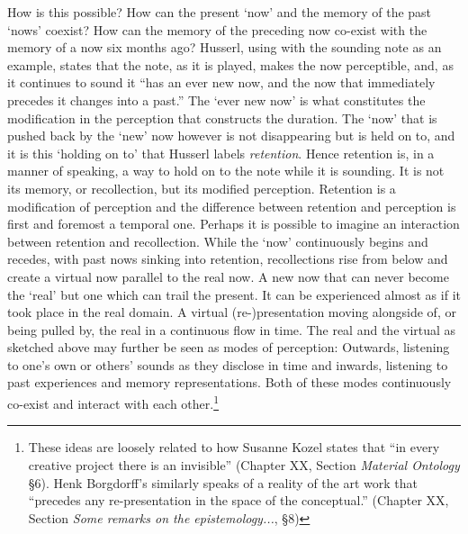 How is this possible? How can the present `now' and the memory of the past `nows' coexist? How can the memory of the preceding now co-exist with the memory of a now six months ago? Husserl, using with the sounding note as an example, states that the note, as it is played, makes the now perceptible, and, as it continues to sound it ``has an ever new now, and the now that immediately precedes it changes into a past.'' \parencite[\emph{Vorlesungen zur Ph{\"a}nomenologi des inneren Zeitbewussteins}, Husserl, E. cited in][32]{ricoeur04} The `ever new now' is what constitutes the modification in the perception that constructs the duration. The `now' that is pushed back by the `new' now however is not disappearing but is held on to, and it is this `holding on to' that Husserl labels \emph{retention}. \parencite[32]{ricoeur04} Hence retention is, in a manner of speaking, a way to hold on to the note while it is sounding. It is not its memory, or recollection, but its modified perception. Retention is a modification of perception and the difference between retention and perception is first and foremost a temporal one. Perhaps it is possible to imagine an interaction between retention and  recollection. While the `now' continuously begins and recedes, with past nows sinking into retention, recollections rise from below and create a virtual now parallel to the real now. A new now that can never become the `real' but one which can trail the present. It can be experienced almost as if it took place in the real domain. A virtual (re-)presentation moving alongside of, or being pulled by, the real in a continuous flow in time. The real and the virtual as sketched above may further be seen as modes of perception: Outwards, listening to one's own or others' sounds as they disclose in time and inwards, listening to past experiences and memory representations. Both of these modes continuously co-exist and interact with each other.\footnote{These ideas are loosely related to how Susanne Kozel states that ``in every creative project there is an invisible'' (Chapter XX, Section \emph{Material Ontology} \S6). Henk Borgdorff's similarly speaks of a reality of the art work that ``precedes any re-presentation in the space of the conceptual.'' (Chapter XX, Section \emph{Some remarks on the epistemology...}, \S8)}


